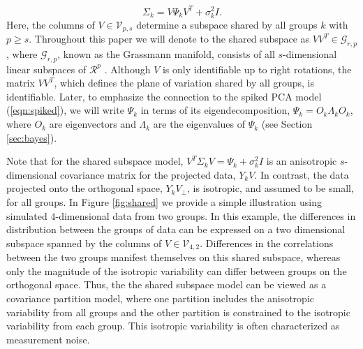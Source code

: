 \documentclass[12pt]{article}
\begin{document}
\begin{equation}
\Sigma_k = V\Psi_kV^T + \sigma^2_kI.
\label{eqn:sspsi}
\end{equation}
%
\noindent Here, the columns of $V \in \mathcal{V}_{p, s}$ determine a subspace
shared by all groups $k$ with $p \geq s$.  Throughout this paper we
will denote to the shared subspace as $VV^T \in \mathcal G_{r,p}$, where
$\mathcal G_{r,p}$, known as the Grassmann manifold, consists of all
$s$-dimensional linear subspaces of $\mathcal{R}^p$
\citep{Chikuse2012}.  Although $V$ is only identifiable up to right
rotations, the matrix $VV^T$, which defines the plane of variation shared by all
groups, is identifiable.  Later, to emphasize the connection to the
spiked PCA model (\ref{eqn:spiked}), we will write $\Psi_k$ in terms
of its eigendecomposition, $\Psi_k = O_k\Lambda_kO_k$, where $O_k$ are
eigenvectors and $\Lambda_k$ are the eigenvalues of $\Psi_k$ (see
Section \ref{sec:bayes}).

Note that for the shared subspace model,
$V^T\Sigma_kV = \Psi_k + \sigma_k^2I$ is an anisotropic
$s$-dimensional covariance matrix for the projected data, $Y_kV$.
In contrast, the data projected onto the orthogonal space,
$Y_kV_{\perp}$, is isotropic, and assumed to be small, for all
groups.  In Figure \ref{fig:shared} we provide a simple illustration
using simulated $4$-dimensional data from two groups.  In this example, the
differences in distribution between the groups of data can be
expressed on a two dimensional subspace spanned by the columns of
$V \in \mathcal{V}_{4, 2}$.  Differences in the correlations between
the two groups manifest themselves on this shared subspace, whereas
only the magnitude of the isotropic variability can differ between groups
on the orthogonal space.  Thus, the the shared subspace model can be
viewed as a covariance partition model, where one partition includes
the anisotropic variability from all groups and the other partition is
constrained to the isotropic variability from each group.  This
isotropic variability is often characterized as measurement noise.



\end{document}
